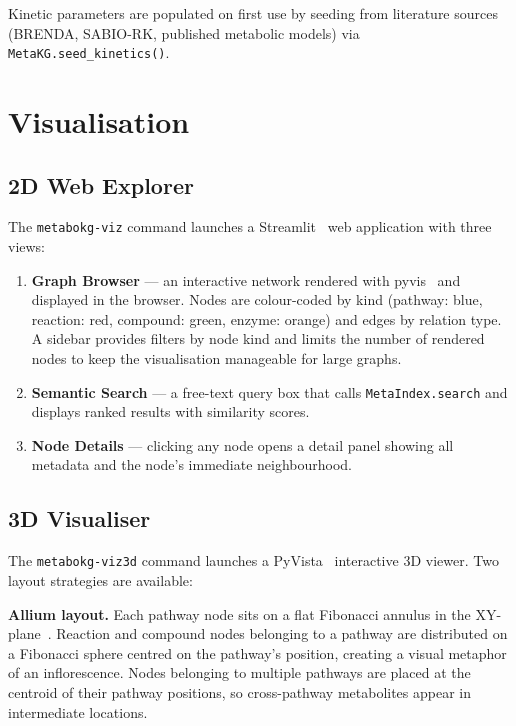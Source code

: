 \documentclass[10pt]{article}
\begin{document}
Kinetic parameters are populated on first use by seeding from literature
sources (BRENDA, SABIO-RK, published metabolic models) via
\texttt{MetaKG.seed\_kinetics()}.

\section{Visualisation}
\label{sec:viz}

\subsection{2D Web Explorer}

The \texttt{metabokg-viz} command launches a Streamlit~\citep{streamlit2019}
web application with three views:

\begin{enumerate}[leftmargin=*,itemsep=2pt]
  \item \textbf{Graph Browser} --- an interactive network rendered with
    pyvis~\citep{pyvis2021} and displayed in the browser. Nodes are
    colour-coded by kind (pathway: blue, reaction: red, compound: green,
    enzyme: orange) and edges by relation type. A sidebar provides filters
    by node kind and limits the number of rendered nodes to keep the
    visualisation manageable for large graphs.
  \item \textbf{Semantic Search} --- a free-text query box that calls
    \texttt{MetaIndex.search} and displays ranked results with similarity
    scores.
  \item \textbf{Node Details} --- clicking any node opens a detail panel
    showing all metadata and the node's immediate neighbourhood.
\end{enumerate}

\subsection{3D Visualiser}

The \texttt{metabokg-viz3d} command launches a PyVista~\citep{sullivan2019pyvista}
interactive 3D viewer. Two layout strategies are available:

\textbf{Allium layout.} Each pathway node sits on a flat Fibonacci annulus in
the XY-plane~\citep{vogel1979fibonacci}. Reaction and compound nodes belonging
to a pathway are distributed on a Fibonacci sphere centred on the pathway's
position, creating a visual metaphor of an inflorescence. Nodes belonging to
multiple pathways are placed at the centroid of their pathway positions, so
cross-pathway metabolites appear in intermediate locations.
\end{document}
